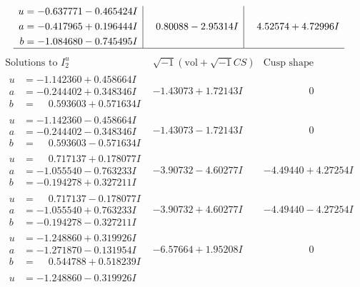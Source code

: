 \documentclass[1p]{elsarticle_modified}
\theoremstyle{definition}
\newcommand{\I}{\sqrt{-1}}
\begin{document}
$$\begin{array}{c|c|c}
\begin{aligned}
u &= -0.637771 - 0.465424 I \\
a &= -0.417965 + 0.196444 I \\
b &= -1.084680 - 0.745495 I\end{aligned}
 & \phantom{-}0.80088 - 2.95314 I & \phantom{-}4.52574 + 4.72996 I\\
 \hline 
 \end{array}$$\newpage$$\begin{array}{c|c|c}  
\text{Solutions to }I^u_{2}& \I (\text{vol} + \sqrt{-1}CS) & \text{Cusp shape}\\
 \hline 
\begin{aligned}
u &= -1.142360 + 0.458664 I \\
a &= -0.244402 + 0.348346 I \\
b &= \phantom{-}0.593603 + 0.571634 I\end{aligned}
 & -1.43073 + 1.72143 I & \phantom{-0.000000 } 0 \\ \hline\begin{aligned}
u &= -1.142360 - 0.458664 I \\
a &= -0.244402 - 0.348346 I \\
b &= \phantom{-}0.593603 - 0.571634 I\end{aligned}
 & -1.43073 - 1.72143 I & \phantom{-0.000000 } 0 \\ \hline\begin{aligned}
u &= \phantom{-}0.717137 + 0.178077 I \\
a &= -1.055540 - 0.763233 I \\
b &= -0.194278 + 0.327211 I\end{aligned}
 & -3.90732 - 4.60277 I & -4.49440 + 4.27254 I \\ \hline\begin{aligned}
u &= \phantom{-}0.717137 - 0.178077 I \\
a &= -1.055540 + 0.763233 I \\
b &= -0.194278 - 0.327211 I\end{aligned}
 & -3.90732 + 4.60277 I & -4.49440 - 4.27254 I \\ \hline\begin{aligned}
u &= -1.248860 + 0.319926 I \\
a &= -1.271870 - 0.131954 I \\
b &= \phantom{-}0.544788 + 0.518239 I\end{aligned}
 & -6.57664 + 1.95208 I & \phantom{-0.000000 } 0 \\ \hline\begin{aligned}
u &= -1.248860 - 0.319926 I \\

\end{aligned}
\end{array}$$
\end{document}
